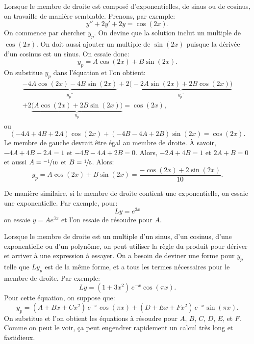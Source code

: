 \medskip

Lorsque le membre de droite est composé d'exponentielles, de sinus ou de cosinus, on travaille de manière semblable. Prenons, par exemple: 
\begin{equation*}
	y''+2y'+2y = \cos (2x) .
\end{equation*}
On commence par chercher $y_p$.  On devine que la solution inclut un multiple de  $\cos(2x)$.
On doit aussi ajouter un multiple de $\sin (2x)$ puisque la dérivée d'un cosinus est un sinus. On essaie donc: 
\begin{equation*}
	y_p = A \cos (2x) + B \sin (2x) .
\end{equation*}
On substitue  $y_p$ dans l'équation et l'on obtient: 
\begin{multline*}
	\underbrace{-4 A \cos (2x) - 4 B \sin (2x)}_{y_p''}
		+2 \underbrace{\bigl(-2A \sin (2x) + 2B \cos (2x)\bigr)}_{y_p'}	\\
		+2 \underbrace{\bigl(A \cos (2x) + 2B \sin (2x)\bigr)}_{y_p}
	= \cos (2x) ,
\end{multline*}
ou
\begin{equation*}
	(-4A+4B+2A) \cos(2x) +	(-4B-4A+2B) \sin(2x) 	= \cos(2x) .
\end{equation*}
Le membre de gauche devrait être égal au membre de droite. À savoir,
$-4A + 4B + 2A = 1$ et $-4B - 4A + 2B = 0$.  
Alors, $-2A+4B =1$ et $2A+B=0$ et aussi   $A=\nicefrac{-1}{10}$ et $B=\nicefrac{1}{5}$.  
Alors: 
\begin{equation*}
y_p = A \cos (2x) + B \sin (2x) = \frac{-\cos (2x) + 2 \sin (2x)}{10} .
\end{equation*}

De manière similaire, si le membre de droite contient une exponentielle, on essaie une exponentielle. Par exemple, pour: 
\begin{equation*}
Ly = e^{3x}
\end{equation*}
on essaie $y = A e^{3x}$ et l'on essaie de résoudre pour $A$.

\medskip

Lorsque le membre de droite est un multiple d'un sinus, d'un cosinus, d'une exponentielle ou d'un polynôme, on peut utiliser la règle du produit pour dériver et arriver à une expression à essayer. On a besoin de deviner une forme pour $y_p$ telle que $Ly_p$ est de la même forme, et a tous les termes nécessaires pour le membre de droite. Par exemple: 
\begin{equation*}
	Ly = (1+3x^2)\,e^{-x}\cos (\pi x) .
\end{equation*}
Pour cette équation, on suppose que: 
\begin{equation*}
	y_p = (A + Bx + Cx^2)\,e^{-x} \cos (\pi x) + (D + Ex + Fx^2)\,e^{-x} \sin (\pi x) .
\end{equation*}
On substitue et l'on obtient les équations à résoudre pour 
$A$, $B$, $C$, $D$, $E$, et $F$.
Comme on peut le voir, ça peut engendrer rapidement un calcul très long et fastidieux.  

